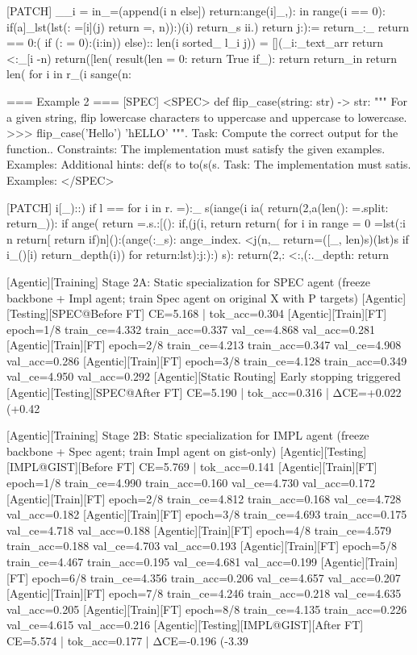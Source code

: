 [PATCH]
__i = in_=(append(i n else]) return:ange(i]_,): in range(i == 0): if(a]_lst(lst(: =[i](j) return  =, n)):)(i) return_s ii.) return j:):= return_:_ return == 0:( if (: = 0):(i:in)) else):: len(i sorted_ l_i j)) = [](_i:_text_arr return <:_[i -n) return([len( result(len = 0: return True if_): return return_in return len( for i in r_(i sange(n:

=== Example 2 ===
[SPEC]
<SPEC> def flip_case(string: str) -> str: """ For a given string, flip lowercase characters to uppercase and uppercase to lowercase. >>> flip_case('Hello') 'hELLO' """. Task: Compute the correct output for the function.. Constraints: The implementation must satisfy the given examples. Examples: Additional hints: def(s to to(s(s. Task: The implementation must satis. Examples: </SPEC>

[PATCH]
i[_)::) if l == for i in r. =):_ s(iange(i ia( return(2,a(len(): =.split: return_)): if ange( return =.s.:[(): if,(j(i, return return( for i in range = 0 =lst(:i n return[ return if)n]():(ange(:_s): ange_index. <j(n,_ return=([_, len)s)(lst)s if i_()[i) return_depth(i)) for return:lst):j:):) s): return(2,: <:,(:._depth: return

[Agentic][Training] Stage 2A: Static specialization for SPEC agent (freeze backbone + Impl agent; train Spec agent on original X with P targets)
[Agentic][Testing][SPEC@Before FT] CE=5.168 | tok_acc=0.304
[Agentic][Train][FT] epoch=1/8 train_ce=4.332 train_acc=0.337 val_ce=4.868 val_acc=0.281
[Agentic][Train][FT] epoch=2/8 train_ce=4.213 train_acc=0.347 val_ce=4.908 val_acc=0.286
[Agentic][Train][FT] epoch=3/8 train_ce=4.128 train_acc=0.349 val_ce=4.950 val_acc=0.292
[Agentic][Static Routing] Early stopping triggered
[Agentic][Testing][SPEC@After FT] CE=5.190 | tok_acc=0.316 | ΔCE=+0.022 (+0.42%

[Agentic][Training] Stage 2B: Static specialization for IMPL agent (freeze backbone + Spec agent; train Impl agent on gist-only)
[Agentic][Testing][IMPL@GIST][Before FT] CE=5.769 | tok_acc=0.141
[Agentic][Train][FT] epoch=1/8 train_ce=4.990 train_acc=0.160 val_ce=4.730 val_acc=0.172
[Agentic][Train][FT] epoch=2/8 train_ce=4.812 train_acc=0.168 val_ce=4.728 val_acc=0.182
[Agentic][Train][FT] epoch=3/8 train_ce=4.693 train_acc=0.175 val_ce=4.718 val_acc=0.188
[Agentic][Train][FT] epoch=4/8 train_ce=4.579 train_acc=0.188 val_ce=4.703 val_acc=0.193
[Agentic][Train][FT] epoch=5/8 train_ce=4.467 train_acc=0.195 val_ce=4.681 val_acc=0.199
[Agentic][Train][FT] epoch=6/8 train_ce=4.356 train_acc=0.206 val_ce=4.657 val_acc=0.207
[Agentic][Train][FT] epoch=7/8 train_ce=4.246 train_acc=0.218 val_ce=4.635 val_acc=0.205
[Agentic][Train][FT] epoch=8/8 train_ce=4.135 train_acc=0.226 val_ce=4.615 val_acc=0.216
[Agentic][Testing][IMPL@GIST][After FT] CE=5.574 | tok_acc=0.177 | ΔCE=-0.196 (-3.39%

